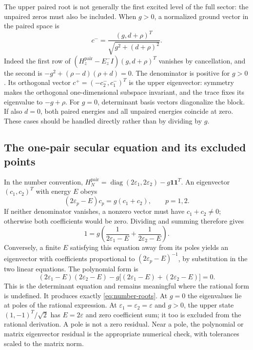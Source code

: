 The upper paired root is not generally the first excited level of the full
sector: the unpaired zeros must also be included. When $g>0$, a normalized
ground vector in the paired space is
\[
 c^- =\frac{(g,d+\rho)^T}{\sqrt{g^2+(d+\rho)^2}}.
\]
Indeed the first row of
$(H_z^{\mathrm{pair}}-E_z^-I)(g,d+\rho)^T$ vanishes by cancellation,
and the second is $-g^2+(\rho-d)(\rho+d)=0$.
The denominator is positive for $g>0$. Its orthogonal vector
$c^+=(-c^-_2,c^-_1)^T$ is the upper eigenvector: symmetry makes the
orthogonal one-dimensional subspace invariant, and the trace fixes its
eigenvalue to $-g+\rho$. For $g=0$, determinant basis vectors diagonalize
the block. If also $d=0$, both paired energies and all unpaired energies
coincide at zero. These cases should be handled directly rather than by
dividing by $g$.

\subsection{The one-pair secular equation and its excluded points}
In the number convention,
$H_N^{\mathrm{pair}}=\operatorname{diag}(2\varepsilon_1,
2\varepsilon_2)-g\boldsymbol 1\boldsymbol 1^T$.
An eigenvector $(c_1,c_2)^T$ with energy $E$ obeys
\[
 (2\varepsilon_p-E)c_p=g(c_1+c_2),\qquad p=1,2.
\]
If neither denominator vanishes, a nonzero vector must have
$c_1+c_2\ne0$; otherwise both coefficients would be zero. Dividing and
summing therefore gives
\begin{equation}
 1=g\left(\frac{1}{2\varepsilon_1-E}
          +\frac{1}{2\varepsilon_2-E}\right).
 \label{eq:richardson}
\end{equation}
Conversely, a finite $E$ satisfying this equation away from its poles yields
an eigenvector with coefficients proportional to
$(2\varepsilon_p-E)^{-1}$, by substitution in the two linear equations.
The polynomial form is
\begin{equation}
 (2\varepsilon_1-E)(2\varepsilon_2-E)
 -g\bigl[(2\varepsilon_1-E)+(2\varepsilon_2-E)\bigr]=0.
 \label{eq:pair-polynomial}
\end{equation}
This is the determinant equation and remains meaningful where the rational
form is undefined. It produces exactly \eqref{eq:number-roots}.
At $g=0$ the eigenvalues lie at poles of the rational expression. At
$\varepsilon_1=\varepsilon_2=\varepsilon$ and $g>0$, the upper state
$(1,-1)^T/\sqrt2$ has $E=2\varepsilon$ and zero coefficient sum;
it too is excluded from the rational derivation. A pole is not a zero
residual. Near a pole, the polynomial or matrix eigenvector residual is the
appropriate numerical check, with tolerances scaled to the matrix norm.

